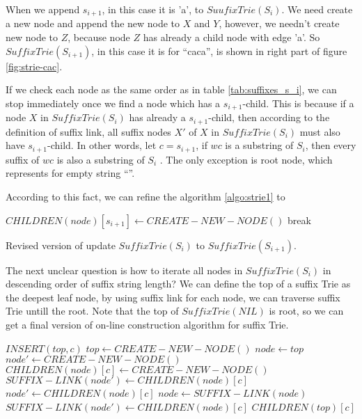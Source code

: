 \documentclass{article}
\begin{document}
When we append $s_{i+1}$, in this case it is 'a', to $SuufixTrie(S_i)$. We need create
a new node and append the new node to $X$ and $Y$, however, we needn't create new
node to $Z$, because node $Z$ has already a child node with edge 'a'. So 
$SuffixTrie(S_{i+1})$, in this case it is for ``caca'', is shown in right part of
figure \ref{fig:strie-cac}.

If we check each node as the same order as in table \ref{tab:suffixes_s_i}, we can 
stop immediately once we find a node which has a $s_{i+1}$-child. This is because 
if a node $X$ in $SuffixTrie(S_i)$ has already a $s_{i+1}$-child, then according to the
definition of suffix link, all suffix nodes $X'$ of $X$ in $SuffixTrie(S_i)$ must 
also have $s_{i+1}$-child. In other words, let $c=s_{i+1}$, if $wc$ is a substring
of $S_i$, then every suffix of $wc$ is also a substring of $S_i$ \cite{ukkonen95}.
The only exception is root node, which represents for empty string ``''.

According to this fact, we can refine the algorithm \ref{algo:strie1} to 

\begin{algorithm}
  \begin{algorithmic}
      \STATE $CHILDREN(node)[s_{i+1}] \leftarrow CREATE-NEW-NODE()$ 
    \ELSE
      \STATE break
    \ENDIF
  \ENDFOR
  \end{algorithmic}
  \caption{Revised version of update $SuffixTrie(S_i)$ to $SuffixTrie(S_{i+1})$.}
  \label{algo:strie2}
\end{algorithm}

The next unclear question is how to iterate all nodes in $SuffixTrie(S_i)$
in descending order of suffix string length? We can define the top of a suffix
Trie as the deepest leaf node, by using suffix link for each node, we can 
traverse suffix Trie untill the root. Note that the top of $SuffixTrie(NIL)$
is root, so we can get a final version of on-line construction algorithm for
suffix Trie.

\begin{algorithmic}
\STATE $INSERT(top, c)$
    \STATE $top \leftarrow CREATE-NEW-NODE()$
  \ENDIF
  \STATE $node \leftarrow top$
  \STATE $node' \leftarrow CREATE-NEW-NODE()$
    \STATE $CHILDREN(node)[c] \leftarrow CREATE-NEW-NODE()$
    \STATE $SUFFIX-LINK(node') \leftarrow CHILDREN(node)[c]$
    \STATE $node' \leftarrow CHILDREN(node)[c]$
    \STATE $node \leftarrow SUFFIX-LINK(node)$
  \ENDWHILE
    \STATE $SUFFIX-LINK(node') \leftarrow CHILDREN(node)[c]$
  \ENDIF
  \RETURN $CHILDREN(top)[c]$
\end{algorithmic}
\end{document}
